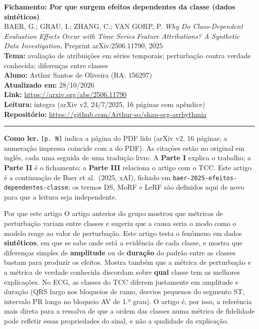 \documentclass[11pt,a4paper]{article}
\begin{document}
\begin{center}
    {\LARGE \textbf{Fichamento: Por que surgem efeitos dependentes da classe (dados sintéticos)}} \\[0.35em]
    {\large BAER, G.; GRAU, I.; ZHANG, C.; VAN GORP, P. \textit{Why Do Class-Dependent Evaluation Effects Occur with Time Series Feature Attributions? A Synthetic Data Investigation}. Preprint arXiv:2506.11790, 2025} \\[0.3em]
    \textbf{Tema:} avaliação de atribuições em séries temporais; perturbação contra verdade conhecida; diferenças entre classes \\[0.2em]
    \textbf{Aluno:} Arthur Santos de Oliveira (RA: 156297) \\[0.2em]
    \textbf{Atualizado em:} 28/10/2026 \\[0.2em]
    \textbf{Link:} \url{https://arxiv.org/abs/2506.11790} \\[0.2em]
    \textbf{Leitura:} íntegra (arXiv v2, 24/7/2025, 16 páginas com apêndice) \\[0.2em]
    \textbf{Repositório:} \url{https://github.com/Arthur-so/shap-ecg-arrhythmia}
\end{center}
\vspace{-0.5em}
\hrule
\vspace{0.8em}

\textbf{Como ler.} \texttt{[p. N]} indica a página do PDF lido (arXiv v2, 16 páginas; a numeração impressa coincide com a do PDF). As citações estão no original em inglês, cada uma seguida de uma tradução livre. A \textbf{Parte I} explica o trabalho; a \textbf{Parte II} é o fichamento; a \textbf{Parte III} relaciona o artigo com o TCC. Este artigo é a continuação de Baer et al.\ (2025, xAI), fichado em \texttt{baer-2025-efeitos-dependentes-classe}; os termos DS, MoRF e LeRF são definidos aqui de novo para que a leitura seja independente.

\begin{infobox}[note]{Por que este artigo}
O artigo anterior do grupo mostrou que métricas de perturbação variam entre classes e sugeriu que a causa seria o modo como o modelo reage ao valor de perturbação. Este artigo testa o fenômeno em dados \textbf{sintéticos}, em que se sabe onde está a evidência de cada classe, e mostra que diferenças simples de \textbf{amplitude} ou de \textbf{duração} do padrão entre as classes bastam para produzir os efeitos. Mostra também que a métrica de perturbação e a métrica de verdade conhecida discordam sobre \textbf{qual} classe tem as melhores explicações. No ECG, as classes do TCC diferem justamente em amplitude e duração (QRS largo nos bloqueios de ramo, desvios pequenos do segmento ST, intervalo PR longo no bloqueio AV de 1.º grau). O artigo é, por isso, a referência mais direta para a ressalva de que a ordem das classes numa métrica de fidelidade pode refletir essas propriedades do sinal, e não a qualidade da explicação.
\end{infobox}
\end{document}
